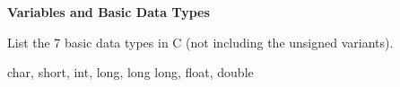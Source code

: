 \textbf{Variables and Basic Data Types}

List the 7 basic data types in C (not including the unsigned variants).

\begin{answer}
char, short, int, long, long long, float, double
\end{answer}